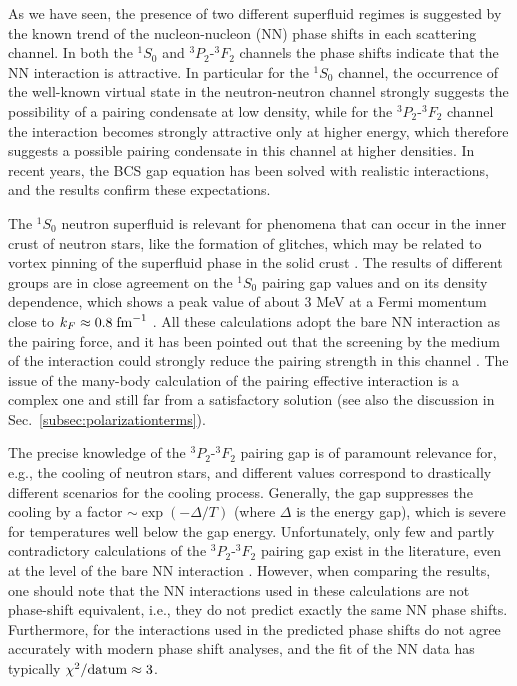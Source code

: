 \documentclass[rmp,preprint,aps,floatfix]{revtex4}
\begin{document}
As we have seen, the  
presence of two different superfluid regimes 
is suggested by the known trend of the 
nucleon-nucleon (NN) phase shifts 
in each scattering channel. 
In both the $^1S_0$ and $^3P_2$-$^3F_2$ channels the
phase shifts indicate that the NN interaction is attractive. 
In particular for the $^1S_0$ channel, the occurrence of 
the well-known virtual state in the neutron-neutron channel
strongly suggests the possibility of a 
pairing condensate at low density, 
while for the $^3P_2$-$^3F_2$ channel the 
interaction becomes strongly attractive only
at higher energy, which therefore suggests a possible 
pairing condensate
in this channel at higher densities. 
In recent years, the BCS gap equation
has been solved with realistic interactions, 
and the results confirm
these expectations. 

The $^1S_0$ neutron superfluid is relevant for phenomena
that can occur in the inner crust of neutron stars, like the 
formation of glitches, which may be related to vortex pinning  
of the superfluid phase in the solid crust \cite{glitch}. 
The results of different groups are in close agreement
on the $^1S_0$ pairing gap values and on 
its density dependence, which
shows a peak value of about 3 MeV at a Fermi momentum close to
$k_F \approx 0.8\; {\rm fm}^{-1}$ \cite{bcll90,kkc96,eh98,sclbl96}. 
All these calculations adopt the bare
NN interaction as the pairing force, and it has been pointed out
that the screening by the medium of the interaction 
could strongly reduce
the pairing strength in this channel \cite{sclbl96,chen86,ains89a,ains89b}. 
The issue of the 
many-body calculation of the pairing 
effective interaction is a complex
one and still far from a satisfactory solution (see
also the discussion in Sec.~\ref{subsec:polarizationterms}).


The precise knowledge of the $^3P_2$-$^3F_2$ pairing gap is of 
paramount relevance for, e.g., the cooling of neutron stars, 
and different values correspond to drastically
different scenarios for the cooling process.
Generally, the gap suppresses the cooling by a factor
$\sim\exp(-\Delta/T)$ (where $\Delta$ is the energy gap),
which is severe for
temperatures well below the gap energy.
Unfortunately, only few and partly
contradictory calculations of the $^3P_2$-$^3F_2$ 
pairing gap exist in the literature, 
even at the level of the bare NN interaction 
\cite{amu85,bcll92,taka93,elga96,kkc96}. 
However, when comparing the results, one should note that the  
NN interactions used in these calculations are not phase-shift 
equivalent, i.e.,  they do not 
predict exactly the same NN phase shifts.  
Furthermore, for the interactions used in 
\cite{amu85,bcll92,taka93,elga96} the predicted 
phase shifts do not agree accurately with modern phase shift 
analyses, and the fit of the NN data has typically 
$\chi^2/{\rm datum}\approx 3$.  
\end{document}
